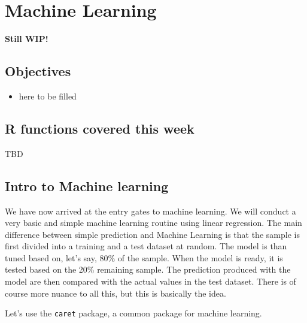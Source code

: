\documentclass[
]{book}
\providecommand{\tightlist}{%
  \setlength{\itemsep}{0pt}\setlength{\parskip}{0pt}}
\begin{document}
\hypertarget{ml}{%
\chapter{Machine Learning}\label{ml}}

\textbf{Still WIP!}

\hypertarget{objectives-7}{%
\section{Objectives}\label{objectives-7}}

\begin{itemize}
\tightlist
\item
  here to be filled
\end{itemize}

\hypertarget{r-functions-covered-this-week-3}{%
\section{R functions covered this week}\label{r-functions-covered-this-week-3}}

TBD

\hypertarget{intro-to-machine-learning}{%
\section{Intro to Machine learning}\label{intro-to-machine-learning}}

We have now arrived at the entry gates to machine learning. We will conduct a very basic and simple machine learning routine using linear regression. The main difference between simple prediction and Machine Learning is that the sample is first divided into a training and a test dataset at random. The model is than tuned based on, let's say, 80\% of the sample. When the model is ready, it is tested based on the 20\% remaining sample. The prediction produced with the model are then compared with the actual values in the test dataset. There is of course more nuance to all this, but this is basically the idea.

Let's use the \texttt{caret} package, a common package for machine learning.
\end{document}
